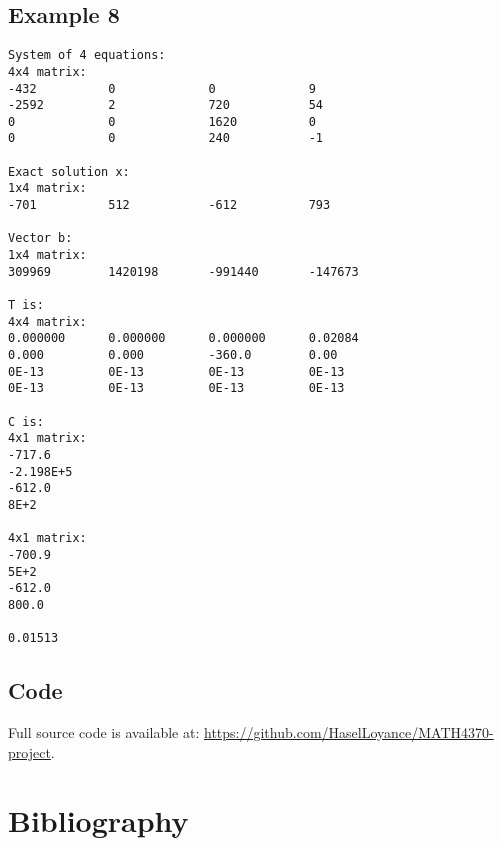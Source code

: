 \documentclass[letterpaper,12pt]{article}
\begin{document}
\subsection{Example 8}
\label{a:E8}
\begin{verbatim}
System of 4 equations:
4x4 matrix:
-432          0             0             9             
-2592         2             720           54            
0             0             1620          0             
0             0             240           -1            

Exact solution x:
1x4 matrix:
-701          512           -612          793           

Vector b:
1x4 matrix:
309969        1420198       -991440       -147673       

T is:
4x4 matrix:
0.000000      0.000000      0.000000      0.02084       
0.000         0.000         -360.0        0.00          
0E-13         0E-13         0E-13         0E-13         
0E-13         0E-13         0E-13         0E-13         

C is:
4x1 matrix:
-717.6        
-2.198E+5     
-612.0        
8E+2          

4x1 matrix:
-700.9        
5E+2          
-612.0        
800.0         

0.01513
\end{verbatim}

\subsection{Code}
Full source code is available at: \url{https://github.com/HaselLoyance/MATH4370-project}.

\section{Bibliography}
\printbibliography[heading=none]
\newpage
\end{document}
